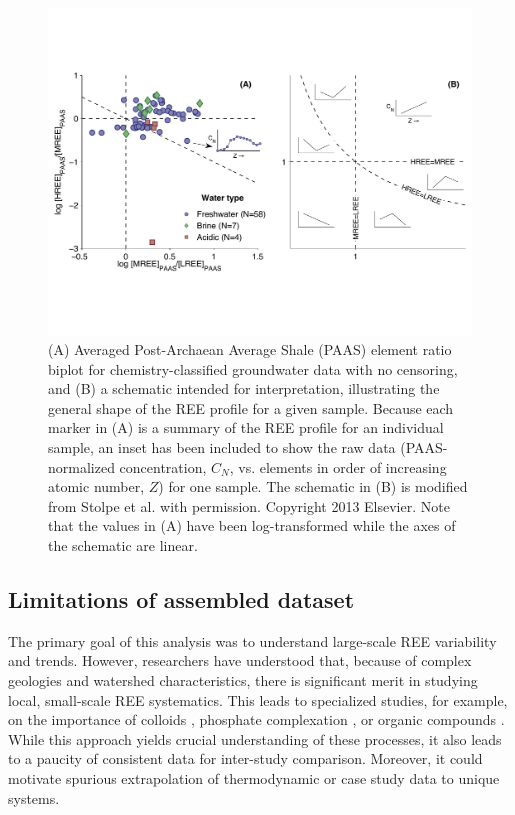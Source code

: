 \begin{figure}[htbp]
\begin{center}
\includegraphics[width=\textwidth]{Ch3_figures/RDV-grouped-biplot.pdf}
\caption{(A) Averaged Post-Archaean Average Shale (PAAS) element ratio biplot for chemistry-classified groundwater data with no censoring, and (B) a schematic intended for interpretation, illustrating the general shape of the REE profile for a given sample.
Because each marker in (A) is a summary of the REE profile for an individual sample, an inset has been included to show the raw data (PAAS-normalized concentration, $C_N$, vs. elements in order of increasing atomic number, $Z$) for one sample.
The schematic in (B) is modified from Stolpe et al. \citep{Stolpe_GCA_2013} with permission.
Copyright 2013 Elsevier.
Note that the values in (A) have been log-transformed while the axes of the schematic are linear.}\label{fig:RDV-biplot}
\end{center}
\end{figure}

\subsection{Limitations of assembled dataset}

The primary goal of this analysis was to understand large-scale REE variability and trends.
However, researchers have understood that, because of complex geologies and watershed characteristics, there is significant merit in studying local, small-scale REE systematics.
This leads to specialized studies, for example, on the importance of colloids \citep{Dia_GCA_2000, Pourret_AG_2010, Stolpe_GCA_2013, Ingri_CG_2000, Sholkovitz_EPSL_1992},
phosphate complexation \citep{Hannigan_CG_2001, Johannesson_EPSL_1996, Johannesson_LO_1994},
or organic compounds \citep{Pourret_JCIS_2007, Johannesson_CG_2000, Marsac_GCA_2011, Pourret_CG_2007, Stern_CG_2007}.
While this approach yields crucial understanding of these processes, it also leads to a paucity of consistent data for inter-study comparison.
Moreover, it could motivate spurious extrapolation of thermodynamic or case study data to unique systems.







